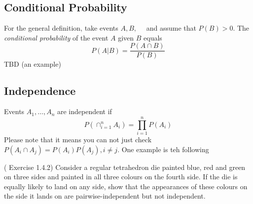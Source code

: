 \subsection{Conditional Probability}
For the general definition, take events \(A, B,\quad\) and assume that \(P(B) > 0\). The \textit{conditional probability} of the event \(A\) given \(B\) equals 
\[
    P(A|B) = \frac{P(A\cap B)}{P(B)}
\]
TBD (an example)
\subsection{Independence}
Events \(A_1,\dots,A_n\) are independent if 
\[
    P(\cap_{i = 1}^n A_i) = \prod_{i=1}^nP(A_i)
\]
Please note that it means you can not just check \(P(A_i\cap A_j) = P(A_i)P(A_j), i \neq j\). One example is teh following 
\begin{eg}
(\cite{IntroPanchenko} Exercise 1.4.2) Consider a regular tetrahedron die painted
blue, red and green on three sides and painted in all three
colours on the fourth side. If the die is equally likely to land
on any side, show that the appearances of these colours on
the side it lands on are pairwise-independent but not independent.
\end{eg}
